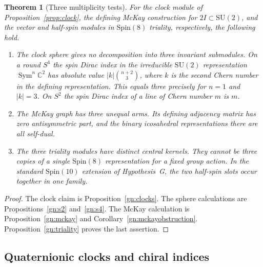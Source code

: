 \documentclass[aps,pra,onecolumn,superscriptaddress,nofootinbib,10pt]{revtex4-2}
\newtheorem{theorem}{Theorem}
\theoremstyle{definition}
\theoremstyle{remark}
\newcommand{\SU}{\mathrm{SU}}
\begin{document}
\begin{theorem}[Three multiplicity tests]\label{gn:main}
For the clock module of Proposition~\ref{prop:clock}, the defining McKay
construction for $2I\subset\SU(2)$, and the vector and half-spin
modules in $\mathrm{Spin}(8)$ triality, respectively, the following hold.
\begin{enumerate}
\item The clock sphere gives no decomposition into three invariant
submodules. On a round $S^4$ the spin Dirac index in the irreducible
$\SU(2)$ representation $\operatorname{Sym}^n\mathbb C^2$ has absolute
value $|k|\binom{n+2}{3}$, where $k$ is the second Chern number in the defining
representation. This equals three precisely for $n=1$ and $|k|=3$.
On $S^2$ the spin Dirac index of a line of Chern number $m$ is $m$.
\item The McKay graph has three unequal arms. Its defining adjacency
matrix has zero antisymmetric part, and the binary icosahedral
representations there are all self-dual.
\item The three triality modules have distinct central kernels.
They cannot be three copies of a single $\mathrm{Spin}(8)$ representation
for a fixed group action. In the standard $\mathrm{Spin}(10)$ extension
of Hypothesis~G, the two half-spin slots occur together in one family.
\end{enumerate}
\end{theorem}
\begin{proof}
The clock claim is Proposition~\ref{gn:clocks}. The sphere calculations are
Propositions~\ref{gn:s2} and~\ref{gn:s4}. The McKay calculation is
Proposition~\ref{gn:mckay} and Corollary~\ref{gn:mckayobstruction}.
Proposition~\ref{gn:triality} proves the last assertion.
\end{proof}

\subsection{Quaternionic clocks and chiral indices}\label{gn:quaternion}
\end{document}

